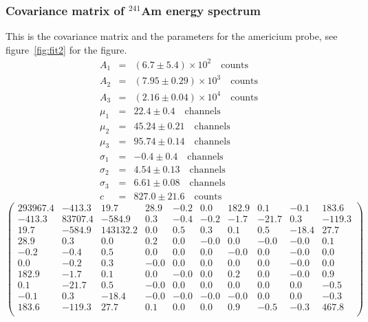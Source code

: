 \subsubsection{Covariance matrix of $^{241}$Am energy spectrum}
This is the covariance matrix and the parameters for the americium probe, see
figure~\ref{fig:fit2} for the figure.
\begin{align*}
    A_1 &=& \left(6.7 \pm 5.4\right) \times 10^{2} \quad \mathrm{counts}\\
    A_2 &=& \left(7.95 \pm 0.29\right) \times 10^{3} \quad\mathrm{counts}\\
    A_3 &=& \left(2.16 \pm 0.04\right) \times 10^{4} \quad\mathrm{counts}\\
    \mu_1 &=& 22.4 \pm 0.4 \quad\mathrm{channels}\\
    \mu_2 &=& 45.24 \pm 0.21 \quad\mathrm{channels}\\
    \mu_3 &=& 95.74 \pm 0.14 \quad\mathrm{channels}\\
    \sigma_1 &=& -0.4 \pm 0.4 \quad\mathrm{channels}\\
    \sigma_2 &=& 4.54 \pm 0.13 \quad\mathrm{channels}\\
    \sigma_3 &=& 6.61 \pm 0.08 \quad\mathrm{channels}\\
    c &=& 827.0 \pm 21.6\quad \mathrm{counts}
\end{align*}
\small
\begin{equation*}
    \begin{pmatrix}
        293967.4 &-413.3 &19.7 &28.9 &-0.2 &0.0 &182.9 &0.1 &-0.1 &183.6 \\
        -413.3 &83707.4 &-584.9 &0.3 &-0.4 &-0.2 &-1.7 &-21.7 &0.3 &-119.3 \\
        19.7 &-584.9 &143132.2 &0.0 &0.5 &0.3 &0.1 &0.5 &-18.4 &27.7 \\
        28.9 &0.3 &0.0 &0.2 &0.0 &-0.0 &0.0 &-0.0 &-0.0 &0.1 \\
        -0.2 &-0.4 &0.5 &0.0 &0.0 &0.0 &-0.0 &0.0 &-0.0 &0.0 \\
        0.0 &-0.2 &0.3 &-0.0 &0.0 &0.0 &0.0 &0.0 &-0.0 &0.0 \\
        182.9 &-1.7 &0.1 &0.0 &-0.0 &0.0 &0.2 &0.0 &-0.0 &0.9 \\
        0.1 &-21.7 &0.5 &-0.0 &0.0 &0.0 &0.0 &0.0 &0.0 &-0.5 \\
        -0.1 &0.3 &-18.4 &-0.0 &-0.0 &-0.0 &-0.0 &0.0 &0.0 &-0.3 \\
        183.6 &-119.3 &27.7 &0.1 &0.0 &0.0 &0.9 &-0.5 &-0.3 &467.8 \\
    \end{pmatrix}
\end{equation*}
\normalsize

